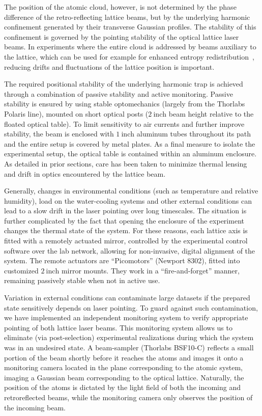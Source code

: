 \documentclass[twocolumn,aip,rsi,reprint,bibnotes]{revtex4-1}
\newcommand\unit[2]{\ensuremath{#1~\mathrm{{#2}}}}
\begin{document}
The position of the atomic cloud, however, is not determined by the phase difference of the retro-reflecting lattice beams, but by the underlying harmonic confinement generated by their transverse Gaussian profiles.
The stability of this confinement is governed by the pointing stability of the optical lattice laser beams.
In experiments where the entire cloud is addressed by beams auxiliary to the lattice, which can be used for example for enhanced entropy redistribution~\cite{Mazurenko2017}, reducing drifts and fluctuations of the lattice position is important.

The required positional stability of the underlying harmonic trap is achieved through a combination of passive stability and active monitoring.
Passive stability is ensured by using stable optomechanics (largely from the Thorlabs Polaris line), mounted on short optical posts (\unit{2}{inch} beam height relative to the floated optical table).
To limit sensitivity to air currents and further improve stability, the beam is enclosed with \unit{1}{inch} aluminum tubes throughout its path and the entire setup is covered by metal plates.
As a final measure to isolate the experimental setup, the optical table is contained within an aluminum enclosure. As detailed in prior sections, care has been taken to minimize thermal lensing and drift in optics encountered by the lattice beam.

Generally, changes in environmental conditions (such as temperature and relative humidity), load on the water-cooling systems and other external conditions can lead to a slow drift in the laser pointing over long timescales.
The situation is further complicated by the fact that opening the enclosure of the experiment changes the thermal state of the system.
For these reasons, each lattice axis is fitted with a remotely actuated mirror, controlled by the experimental control software over the lab network, allowing for non-invasive, digital alignment of the system.
The remote actuators are ``Picomotors'' (Newport 8302), fitted into customized \unit{2}{inch} mirror mounts.
They work in a ``fire-and-forget'' manner, remaining passively stable when not in active use.

Variation in external conditions can contaminate large datasets if the prepared state sensitively depends on laser pointing.
To guard against such contamination, we have implemented an independent monitoring system to verify appropriate pointing of both lattice laser beams.
This monitoring system allows us to eliminate (via post-selection) experimental realizations during which the system was in an undesired state.
A beam-sampler (Thorlabs BSF10-C) reflects a small portion of the beam shortly before it reaches the atoms and images it onto a monitoring camera located in the plane corresponding to the atomic system, imaging a Gaussian beam corresponding to the optical lattice.
Naturally, the position of the atoms is dictated by the light field of both the incoming and retroreflected beams, while the monitoring camera only observes the position of the incoming beam.
\end{document}
